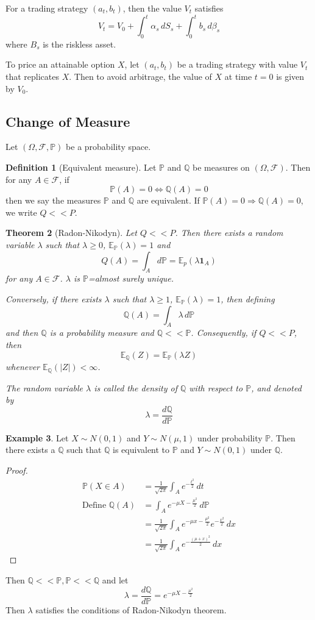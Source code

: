 \documentclass[10pt, oneside, reqno]{amsart}
\theoremstyle{plain}%
\newtheorem{thm}{Theorem}[section]
\theoremstyle{definition}
\newtheorem{defn}[thm]{Definition}
\newtheorem{exmp}[thm]{Example}
\theoremstyle{remark}
\newcommand{\Q}{\mathbb{Q}}
\renewcommand{\P}{\mathbb{P}}
\newcommand{\E}{\mathbb{E}}
\newcommand{\sigf}{\mathcal{F}}
\begin{document}
For a trading strategy $(a_t, b_t)$, then the value $V_t$ satisfies \[
	V_t = V_0 + \int_0^t \alpha_s \, dS_s + \int_0^t b_s \, d\beta_s
\] where $B_s$ is the riskless asset.

To price an attainable option $X$, let $(a_t, b_t)$ be a trading strategy with value $V_t$ that replicates $X$. Then to avoid arbitrage, the value of $X$ at time $t = 0$ is given by $V_0$.

\subsection{Change of Measure} %
\label{sec:change_of_measure}
Let $(\Omega, \sigf, \P)$ be a probability space.

\begin{defn}[Equivalent measure]
	
	
Let $\P$ and $\Q$ be measures on $(\Omega, \sigf)$.  Then for any $A \in \sigf$, if \[
\P(A) = 0 \iff \Q(A) = 0
\] then we say the measures $\P$ and $\Q$ are equivalent.  If $\P(A) = 0 \Rightarrow \Q(A) = 0$, we write $Q << P$. 
\end{defn}  

\begin{thm}[Radon-Nikodyn]
	Let $Q << P$.  Then there exists a random variable $\lambda$ such that $\lambda \geq 0$, $\E_\P(\lambda) = 1$ and \[
		Q(A) = \int_A d\P = \E_p (\lambda \mathbf{1}_A) 
	\] for any $A \in \sigf$.  $\lambda$ is $\P$=almost surely unique. 
	
	Conversely, if there exists $\lambda$ such that $\lambda \geq 1$, $\E_\P (\lambda) = 1$, then defining \[
		\Q(A) = \int_A \lambda \, d\P
	\] and then $\Q$ is a probability measure and $\Q << \P$.  Consequently, if $Q << P$, then \[
		\E_\Q(Z) = \E_\P(\lambda Z)
	\] whenever $\E_\Q(|Z|) < \infty$.  
	
	The random variable $\lambda$ is called the density of $\Q$ with respect to $\P$, and denoted by \[
		\lambda = \frac{d\Q}{d\P}
	\]
\end{thm}

\begin{exmp}
	Let $X \sim N(0, 1)$ and $Y \sim N(\mu, 1)$ under probability $\P$.  Then there exists a $\Q$ such that $\Q$ is equivalent to $\P$ and $Y \sim N(0, 1)$ under $\Q$.  
\end{exmp}
\begin{proof}
	\begin{align*}
		\P(X \in A) &= \frac{1}{\sqrt{2 \pi}} \int_A e^{-\frac{t^2}{2}} \, dt \\
		\text{Define } \Q(A) 	&= \int_A e^{- \mu X - \frac{\mu^2}{2}} \, d\P  \\
							&= \frac{1}{\sqrt{2 \pi}} \int_A e^{- \mu x - \frac{\mu^2}{2}} e^{-\frac{x^2}{2}} \, dx \\
							&= \frac{1}{\sqrt{2 \pi}} \int_A e^{-\frac{(\mu + x)^2}{2}} \, dx
	\end{align*}  
\end{proof}  Then $\Q << \P, \P << \Q$ and let \[
	\lambda = \frac{d\Q}{d\P} = e^{-\mu X - \frac{\mu^2}{2}}
\]  Then $\lambda$ satisfies the conditions of Radon-Nikodyn theorem.  
\end{document}
